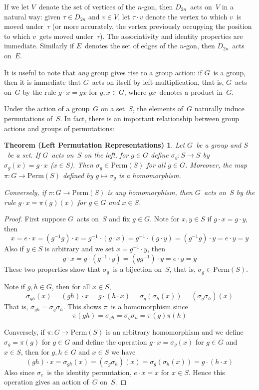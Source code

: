 \documentclass[letterpaper]{article}
\theoremstyle{definition}
\theoremstyle{plain}
\newtheorem*{LPR}{Theorem (Left Permutation Representations)}
\newcommand{\perm}[1]{\mathrm{Perm}({#1})}
\begin{document}
If we let $V$~denote the set of vertices of the $n$-gon, then $D_{2n}$~acts on~$V$ in a natural way: given $\tau\in D_{2n}$ and $v\in V$, let $\tau\cdot v$ denote the vertex to which $v$~is moved under~$\tau$ (or more accurately, the vertex previously occupying the position to which $v$~gets moved under~$\tau$). The associativity and identity properties are immediate. Similarly if $E$~denotes the set of edges of the $n$-gon, then $D_{2n}$~acts on~$E$.

It is useful to note that \emph{any} group gives rise to a group action: if $G$~is a group, then it is immediate that $G$~acts on itself by left multiplication, that is, $G$~acts on~$G$ by the rule $g\cdot x=gx$ for $g,x\in G$, where $gx$~denotes a product in~$G$.

Under the action of a group~$G$ on a set~$S$, the elements of~$G$ naturally induce permutations of~$S$. In fact, there is an important relationship between group actions and groups of permutations:
\goodbreak
\begin{LPR}
Let $G$~be a group and $S$~be a set. If $G$~acts on~$S$ on the left, for $g\in G$ define $\sigma_g:S\to S$ by $\sigma_g(x)=g\cdot x$ ($x\in S$). Then $\sigma_g\in\perm{S}$ for all $g\in G$. Moreover, the map $\pi:G\to\perm{S}$ defined by $g\mapsto\sigma_g$ is a homomorphism.

Conversely, if $\pi:G\to\perm{S}$ is any homomorphism, then $G$~acts on~$S$ by the rule $g\cdot x=\pi(g)(x)$ for $g\in G$ and $x\in S$.
\end{LPR}
\begin{proof}
First suppose $G$~acts on~$S$ and fix $g\in G$. Note for $x,y\in S$ if $g\cdot x=g\cdot y$, then
$$x=e\cdot x=(g^{-1}g)\cdot x=g^{-1}\cdot(g\cdot x)=g^{-1}\cdot(g\cdot y)=(g^{-1}g)\cdot y=e\cdot y=y$$
Also if $y\in S$ is arbitrary and we set $x=g^{-1}\cdot y$, then
$$g\cdot x=g\cdot(g^{-1}\cdot y)=(gg^{-1})\cdot y=e\cdot y=y$$
These two properties show that $\sigma_g$~is a bijection on~$S$, that is, $\sigma_g\in\perm{S}$.

Note if $g,h\in G$, then for all $x\in S$,
\begin{equation}
\sigma_{gh}(x)=(gh)\cdot x=g\cdot(h\cdot x)=\sigma_g(\sigma_h(x))=(\sigma_g\sigma_h)(x)\label{LPR:perm}
\end{equation}
That is, $\sigma_{gh}=\sigma_g\sigma_h$. This shows $\pi$~is a homomorphism since
$$\pi(gh)=\sigma_{gh}=\sigma_g\sigma_h=\pi(g)\pi(h)$$

Conversely, if $\pi:G\to\perm{S}$ is an arbitrary homomorphism and we define $\sigma_g=\pi(g)$ for $g\in G$ and define the operation $g\cdot x=\sigma_g(x)$ for $g\in G$ and $x\in S$, then for $g,h\in G$ and $x\in S$ we have
\begin{equation}
(gh)\cdot x=\sigma_{gh}(x)=(\sigma_g\sigma_h)(x)=\sigma_g(\sigma_h(x))=g\cdot(h\cdot x)\label{LPR:act}
\end{equation}
Also since $\sigma_e$~is the identity permutation, $e\cdot x=x$ for $x\in S$. Hence this operation gives an action of~$G$ on~$S$.
\end{proof}
\end{document}
